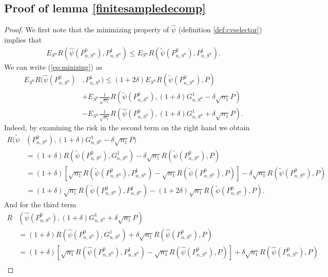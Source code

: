 \documentclass[11pt, a4paper]{article}
\theoremstyle{definition}
\theoremstyle{remark}
\newcommand{\la}{\psi}
\newcommand{\Sn}{S^n}
\begin{document}
\subsection{Proof of lemma \ref{finitesampledecomp}}
\begin{proof}
    We first note that the minimizing property of $ \hat{\la} $ (definition \ref{def:cvselector}) implies that 
    \begin{align}
        E_{\Sn} R( \hat{\la}(P_{n, \Sn}^{0}), P_{n, \Sn}^{1} ) \leq E_{\Sn} R( \tilde{\la}(P_{n, \Sn}^{0}) , P_{n, \Sn}^{1}  ). \label{eq:minizing} 
    \end{align}
   We can write (\ref{eq:minizing}) as  
   \begin{align*}
       E_{\Sn} R( \hat{\la}(P_{n, \Sn}^{0} )&, P_{n, \Sn}^{1}) \leq (1 + 2 \delta) E_{\Sn} R( \tilde{\la}(P_{n, \Sn}^{0}) , P ) \\ 
               &+E_{\Sn} \frac{1}{\sqrt{n_1} } R(\tilde{\la} (P_{n, \Sn}^{0}), (1 + \delta) G_{n,\Sn}^{1} - \delta \sqrt{n_1} P)\\
               &-E_{\Sn} \frac{1}{\sqrt{n_1} } R(\hat{\la}(P_{n, \Sn}^{0}), (1 + \delta) G_{n,\Sn}^{1} + \delta \sqrt{n_1} P)  .
   \end{align*}
  Indeed, by examining the risk in the second term on the right hand we obtain 
  \begin{align*}
      R(\tilde{\la} &(P_{n, \Sn}^{0}), (1 + \delta) G_{n,\Sn}^{1} - \delta \sqrt{n_1} P)\\
                    &= (1 + \delta) R(\tilde{\la} (P_{n, \Sn}^{0}), G_{n,\Sn}^{1}) - \delta \sqrt{n_1} R(\tilde{\la} (P_{n, \Sn}^{0}), P) \\ 
                    &= (1 + \delta) \left[\sqrt{n_1} R(\tilde{\la} (P_{n, \Sn}^{0}), P_{n,\Sn}^{1}) - \sqrt{n_1} R(\tilde{\la} (P_{n, \Sn}^{0}), P)\right] - \delta \sqrt{n_1} R(\tilde{\la} (P_{n, \Sn}^{0}), P)\\ 
                    &= (1 + \delta) \sqrt{n_1} R(\tilde{\la} (P_{n, \Sn}^{0}), P_{n,\Sn}^{1}) - (1 + 2\delta)\sqrt{n_1}   R(\tilde{\la} (P_{n, \Sn}^{0}), P).
  \end{align*}
  And for the third term 
  \begin{align*}
     R&(\hat{\la}(P_{n, \Sn}^{0}), (1 + \delta) G_{n,\Sn}^{1} + \delta \sqrt{n_1} P)\\
       &= (1 + \delta) R(\hat{\la} (P_{n, \Sn}^{0}), G_{n,\Sn}^{1}) + \delta \sqrt{n_1} R(\hat{\la} (P_{n, \Sn}^{0}), P) \\ 
       &= (1 + \delta) \left[\sqrt{n_1} R(\hat{\la} (P_{n, \Sn}^{0}), P_{n,\Sn}^{1}) - \sqrt{n_1} R(\hat{\la} (P_{n, \Sn}^{0}), P)\right] + \delta \sqrt{n_1} R(\hat{\la} (P_{n, \Sn}^{0}), P)\\ 

\end{align*}
\end{proof}
\end{document}
